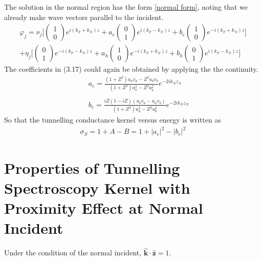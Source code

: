 The solution in the normal region has the form \eqref{normal form}, noting that we already make wave vectors parallel to the incident.
\begin{eqnarray}\label{normal form}
\varphi_j=\nu_j\Big[
\left(
\begin{array}{c}
1\\
0
\end{array}\right)e^{i(k_F+k_N)z}+a_e\left(
\begin{array}{c}
0\\
1
\end{array}\right)e^{i(k_F-k_N)z}+b_e\left(
\begin{array}{c}
1\\
0
\end{array}\right)e^{-i(k_F+k_N)z}\Big]\nonumber\\
+\eta_j\Big[
\left(
\begin{array}{c}
0\\
1
\end{array}\right)e^{-i(k_F-k_N)z}+a_h\left(
\begin{array}{c}
1\\
0
\end{array}\right)e^{-i(k_F+k_N)z}+b_h\left(
\begin{array}{c}
0\\
1
\end{array}\right)e^{i(k_F-k_N)z}\Big]
\end{eqnarray}
The coefficients in (3.17) could again be obtained by applying the the continuity.
\begin{eqnarray}\label{reflection terms}
&&a_e=\frac{(1+Z^2)u_av_a-Z^2u_bv_b}{(1+Z^2)u_a^2-Z^2u_b^2}e^{-2ik_Nz_N}\nonumber\\
&&\\
&&b_e=\frac{iZ(1-iZ)(u_bv_a-u_av_b)}{(1+Z^2)u_a^2-Z^2u_b^2}e^{-2ik_Nz_N}\nonumber
\end{eqnarray}
So that the tunnelling conductance kernel versus energy is written as 
\begin{eqnarray}
\sigma_S=1+A-B=1+\left\vert a_e\right\vert^2-\left\vert b_e\right\vert^2
\end{eqnarray}



\section{Properties of Tunnelling Spectroscopy Kernel with Proximity Effect at Normal Incident}
Under the condition of the normal incident, $\widehat{\mathbf{k}}\cdot\widehat{\mathbf{z}}=1$. 


